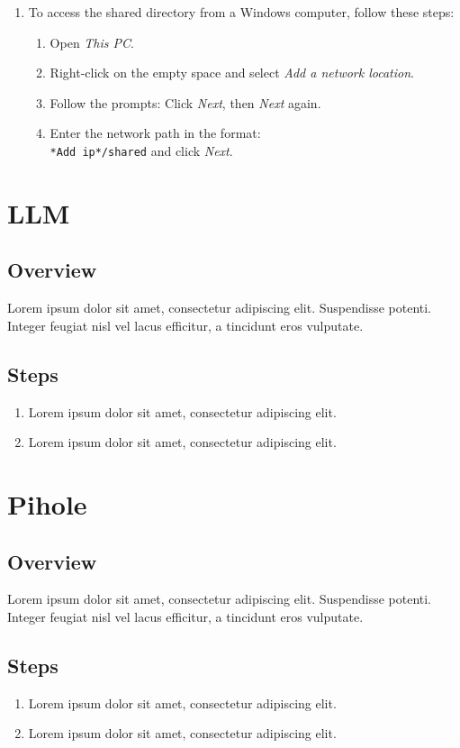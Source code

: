\documentclass[a4paper,12pt]{article}
\begin{document}
\begin{enumerate}
    \item To access the shared directory from a Windows computer, follow these steps:
     \begin{enumerate}
        \item Open \textit{This PC}.
        \item Right-click on the empty space and select \textit{Add a network location}.
        \item Follow the prompts: Click \textit{Next}, then \textit{Next} again.
        \item Enter the network path in the format: \texttt{\\*Add ip*/shared} and click \textit{Next}.
      \end{enumerate}

\end{enumerate}


\section{LLM}

\subsection{Overview}
Lorem ipsum dolor sit amet, consectetur adipiscing elit. Suspendisse potenti. Integer feugiat nisl vel lacus efficitur, a tincidunt eros vulputate.

\subsection{Steps}
\begin{enumerate}
    \item Lorem ipsum dolor sit amet, consectetur adipiscing elit.
    \item Lorem ipsum dolor sit amet, consectetur adipiscing elit.
\end{enumerate}

\section{Pihole}

\subsection{Overview}
Lorem ipsum dolor sit amet, consectetur adipiscing elit. Suspendisse potenti. Integer feugiat nisl vel lacus efficitur, a tincidunt eros vulputate.

\subsection{Steps}
\begin{enumerate}
    \item Lorem ipsum dolor sit amet, consectetur adipiscing elit.
    \item Lorem ipsum dolor sit amet, consectetur adipiscing elit.
\end{enumerate}
\end{document}
